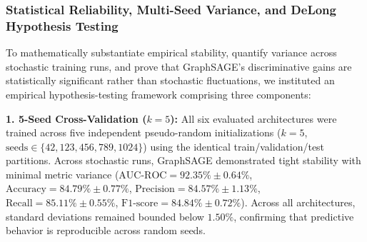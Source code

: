 \documentclass[preprint,12pt]{elsarticle}
\begin{document}
\subsubsection{Statistical Reliability, Multi-Seed Variance, and DeLong Hypothesis Testing}
To mathematically substantiate empirical stability, quantify variance across stochastic training runs, and prove that GraphSAGE's discriminative gains are statistically significant rather than stochastic fluctuations, we instituted an empirical hypothesis-testing framework comprising three components:

\textbf{1. 5-Seed Cross-Validation ($k=5$):} All six evaluated architectures were trained across five independent pseudo-random initializations ($k=5$, $\text{seeds} \in \{42, 123, 456, 789, 1024\}$) using the identical train/validation/test partitions. Across stochastic runs, GraphSAGE demonstrated tight stability with minimal metric variance ($\text{AUC-ROC} = 92.35\% \pm 0.64\%$, $\text{Accuracy} = 84.79\% \pm 0.77\%$, $\text{Precision} = 84.57\% \pm 1.13\%$, $\text{Recall} = 85.11\% \pm 0.55\%$, $\text{F1-score} = 84.84\% \pm 0.72\%$). Across all architectures, standard deviations remained bounded below $1.50\%$, confirming that predictive behavior is reproducible across random seeds.
\end{document}
